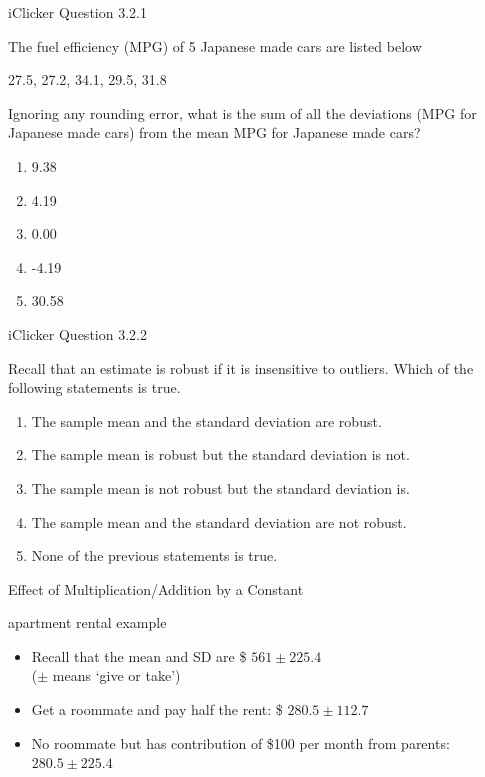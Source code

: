 \documentclass[14pt]{beamer}\usepackage[]{graphicx}\usepackage[]{color}
\begin{document}
\begin{frame}[fragile]{iClicker Question 3.2.1}

The fuel efficiency (MPG) of 5 Japanese made cars are listed below

27.5,	27.2,	34.1,	29.5,	31.8

Ignoring any rounding error, what is the sum of all the deviations (MPG  for Japanese made cars) from the mean MPG for Japanese made  cars?

\begin{enumerate}
\item 9.38
\item 4.19
\item 0.00
\item -4.19
\item 30.58
\end{enumerate}
\end{frame}

\begin{frame}[fragile]{iClicker Question 3.2.2}

Recall that an estimate is robust if it is insensitive to outliers. Which of  the following statements is true.

\begin{enumerate}
\item The sample mean and the standard deviation are robust.
\item The sample mean is robust but the standard deviation is  not.
\item The sample mean is not robust but the standard deviation  is.
\item The sample mean and the standard deviation are not  robust.
\item None of the previous statements is true.
\end{enumerate}
\end{frame}

\begin{frame}[fragile]{Effect of Multiplication/Addition by a Constant}



\begin{center}
apartment rental example
\end{center}

\begin{itemize}
\item<1-> Recall that the mean and SD are \$ $561 \pm 225.4$ \\ ($\pm$ means `give or take')
\item<2-> Get a roommate and pay half the rent: \$ $280.5 \pm 112.7$ %
\item<3-> No roommate but has contribution of \$100 per month from parents: $280.5 \pm 225.4$    %
\end{itemize}
\end{frame}
\end{document}
